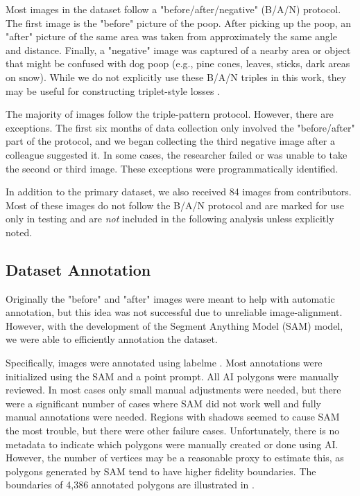 \documentclass[10pt,twocolumn,letterpaper]{article}
\begin{document}
Most images in the dataset follow a "before/after/negative" (B/A/N) protocol.
The first image is the "before" picture of the poop.
After picking up the poop, an "after" picture of the same area was taken from approximately the same angle
  and distance.
Finally, a "negative" image was captured of a nearby area or object that might be confused with dog poop
  (e.g., pine cones, leaves, sticks, dark areas on snow).
While we do not explicitly use these B/A/N triples in this work, they may be useful for constructing
  triplet-style losses \cite{schroff_facenet_2015}.

The majority of images follow the triple-pattern protocol.
However, there are exceptions.
The first six months of data collection only involved the "before/after" part of the protocol, and we began
  collecting the third negative image after a colleague suggested it.
In some cases, the researcher failed or was unable to take the second or third image.
These exceptions were programmatically identified.
  
In addition to the primary dataset, we also received 84 images from contributors.
Most of these images do not follow the B/A/N protocol and are marked for use only in testing and are
  \emph{not} included in the following analysis unless explicitly noted.


\subsection{Dataset Annotation}

Originally the "before" and "after" images were meant to help with automatic
annotation, but this idea was not successful due to unreliable image-alignment.
However, with the development of the Segment Anything Model (SAM)
\cite{kirillov_segment_2023} model, we were able to efficiently annotation the
dataset. 

Specifically, images were annotated using labelme \cite{wada_labelmeailabelme_nodate}. 
Most annotations were initialized using the SAM and a point prompt. 
All AI polygons were manually reviewed. In most cases only small manual
adjustments were needed, but there were a significant number of cases where SAM
did not work well and fully manual annotations were needed.
Regions with shadows seemed to cause SAM the most trouble, but there were other
failure cases. Unfortunately, there is no metadata to indicate which polygons
were manually created or done using AI.  However, the number of vertices may be
a reasonable proxy to estimate this, as polygons generated by SAM tend to have
higher fidelity boundaries.  The boundaries of 4,386 annotated polygons are
illustrated in .
\end{document}
